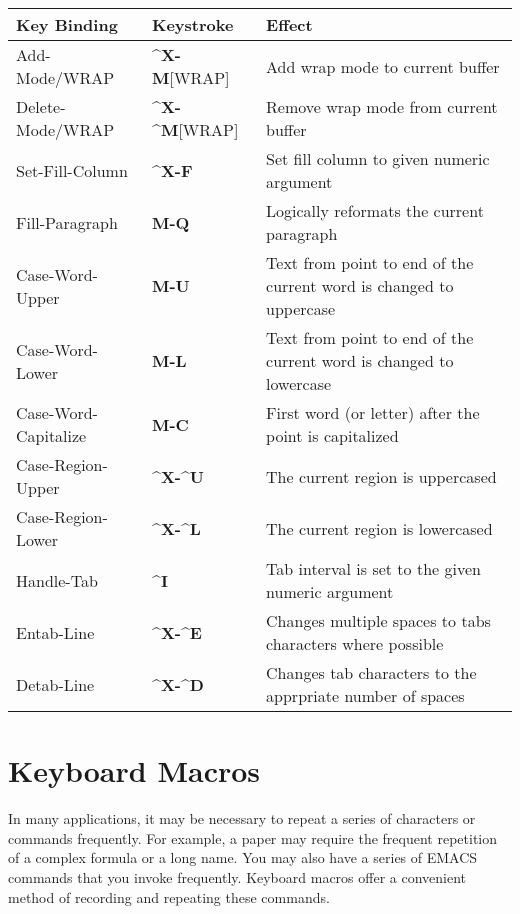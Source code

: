 \begin{tabular}{llp{266pt}}
Key Binding & Keystroke &     Effect \\ \hline

Add-Mode/WRAP & {\bf{}\^{}X-M}[WRAP] & Add wrap mode to current buffer \\

Delete-Mode/WRAP & {\bf{}\^{}X-\^{}M}[WRAP] & Remove wrap mode from
current buffer \\

Set-Fill-Column & {\bf{}\^{}X-F}  & Set fill column to given numeric
argument  \\

Fill-Paragraph & {\bf{}M-Q} & Logically reformats the current
paragraph\\

Case-Word-Upper  & {\bf{}M-U} & Text from point to end of the
current word is changed to uppercase\\

Case-Word-Lower  & {\bf{}M-L} & Text from point to end of the
current word is changed to lowercase\\

Case-Word-Capitalize & {\bf{}M-C} & First word (or letter) after the
point is capitalized\\

Case-Region-Upper & {\bf{}\^{}X-\^{}U} & The current region is uppercased\\

Case-Region-Lower & {\bf{}\^{}X-\^{}L} & The current region is lowercased\\

Handle-Tab & {\bf{}\^{}I} & Tab interval is set to the given
numeric argument\\

Entab-Line & {\bf{}\^{}X-\^{}E} & Changes multiple spaces to tabs
characters where possible\\

Detab-Line & {\bf{}\^{}X-\^{}D} & Changes tab characters to the
apprpriate number of spaces\\

\end{tabular}
\chapter{Keyboard Macros}

In many applications, it may be necessary to repeat a series of
characters or commands frequently.  For example, a paper may require the
frequent repetition of a complex formula or a long name.  You may also
have a series of EMACS commands that you invoke frequently.  Keyboard
macros offer a convenient method of recording and repeating these
commands.

